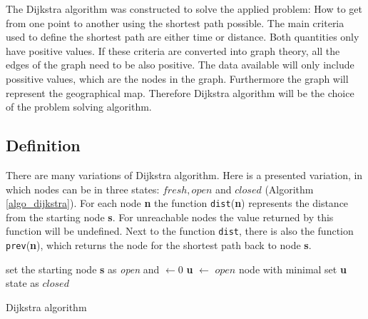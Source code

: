 \documentclass[thesis=M,english]{FITthesis}[2012/10/20]
\begin{document}
The Dijkstra algorithm was constructed to solve the applied problem: How to get from one point to another using the shortest path possible. %
The main criteria used to define the shortest path are either time or distance. Both quantities only have positive values. If these criteria are converted into graph theory, all the edges of the graph need to be also positive.
The data available will only include possitive values, which are the nodes in the graph. Furthermore the graph will represent the geographical map. Therefore Dijkstra algorithm will be the choice of the problem solving algorithm. 

 \subsection{Definition}
There are many variations of Dijkstra algorithm. Here is a presented variation, in which nodes can be in three states: $fresh, open $ and $closed$ (Algorithm \ref{algo_dijkstra}). For each node \textbf{n} the function \texttt{dist}(\textbf{n}) represents the distance from the starting node \textbf{s}. For unreachable nodes the value returned by this function will be undefined. Next to the function \texttt{dist}, there is also the function \texttt{prev}(\textbf{n}), which returns the node for the shortest path back to node \textbf{s}.

\begin{algorithm}[H]
 set the starting node \textbf{s} as \textit{open} and $ \leftarrow 0$\;
 {
  \textbf{u} $\leftarrow$ $open$ node with minimal  \;
  set \textbf{u} state as $closed$	\;
  {
  } 
 }
\caption{Dijkstra algorithm}\label{algo_dijkstra}
\end{algorithm}
\end{document}
